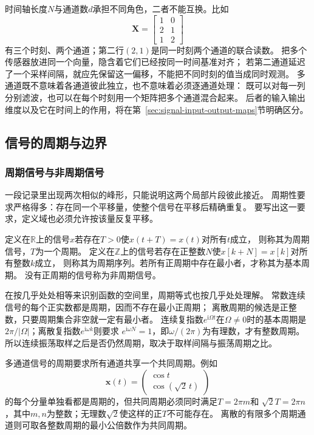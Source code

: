 时间轴长度$N$与通道数$d$承担不同角色，二者不能互换。比如
\begin{equation}
  \bm X=
  \begin{bmatrix}1&0\\2&1\\1&2\end{bmatrix}
  \label{eq:signal-multichannel-record}
\end{equation}
有三个时刻、两个通道；第二行$(2,1)$是同一时刻两个通道的联合读数。
把多个传感器放进同一个向量，隐含着它们已经按同一时间基准对齐；
若第二通道延迟了一个采样间隔，就应先保留这一偏移，不能把不同时刻的值当成同时观测。
多通道既不意味着各通道彼此独立，也不意味着必须逐通道处理：
既可以对每一列分别滤波，也可以在每个时刻用一个矩阵把多个通道混合起来。
后者的输入输出维度以及它在时间上的作用，将在第~\ref{sec:signal-input-output-maps}节明确区分。

\subsection{信号的周期与边界}

\subsubsection{周期信号与非周期信号}

一段记录里出现两次相似的峰形，只能说明这两个局部片段彼此接近。
周期性要求严格得多：存在同一个平移量，使整个信号在平移后精确重复。
要写出这一要求，定义域也必须允许按该量反复平移。
\begin{definition}[周期及基本周期]
  \label{def:signal-period}
  定义在$\mathbb R$上的信号$x$若存在$T>0$使$x(t+T)=x(t)$对所有$t$成立，
  则称其为周期信号，$T$为一个周期。
  定义在$\mathbb Z$上的信号若存在正整数$N$使$x[k+N]=x[k]$对所有整数$k$成立，
  则称其为周期序列。若所有正周期中存在最小者，才称其为基本周期。
  没有正周期的信号称为非周期信号。
\end{definition}

在按几乎处处相等来识别函数的空间里，周期等式也按几乎处处理解。
常数连续信号的每个正实数都是周期，因而不存在最小正周期；
离散周期的候选是正整数，只要周期集合非空就一定有最小者。
连续复指数$e^{\mathrm i\Omega t}$在$\Omega\neq0$时的基本周期是
$2\pi/|\Omega|$；离散复指数$e^{\mathrm i\omega k}$则要求
$e^{\mathrm i\omega N}=1$，即$\omega/(2\pi)$为有理数，才有整数周期。
所以连续振荡取样之后是否仍然周期，取决于取样间隔与振荡周期之比。

多通道信号的周期要求所有通道共享一个共同周期。例如
\[
  \bm x(t)=\begin{pmatrix}\cos t\\\cos(\sqrt2\,t)\end{pmatrix}
\]
的每个分量单独看都是周期的，但共同周期必须同时满足$T=2\pi m$和
$\sqrt2 T=2\pi n$，其中$m,n$为整数；无理数$\sqrt2$使这样的正$T$不可能存在。
离散的有限多个周期通道则可取各整数周期的最小公倍数作为共同周期。

